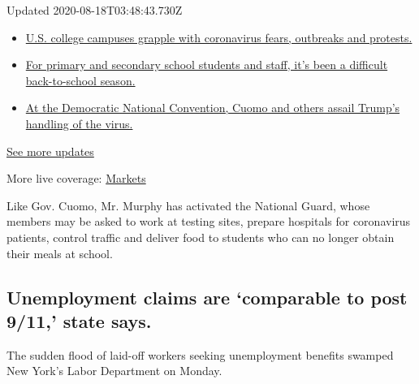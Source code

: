 Updated 2020-08-18T03:48:43.730Z

\begin{itemize}
\tightlist
\item
  \href{https://www.nytimes3xbfgragh.onion/2020/08/17/world/coronavirus-covid.html?action=click\&pgtype=Article\&state=default\&region=MAIN_CONTENT_1\&context=storylines_live_updates\#link-6fdbc8ef}{U.S.
  college campuses grapple with coronavirus fears, outbreaks and
  protests.}
\item
  \href{https://www.nytimes3xbfgragh.onion/2020/08/17/world/coronavirus-covid.html?action=click\&pgtype=Article\&state=default\&region=MAIN_CONTENT_1\&context=storylines_live_updates\#link-7e47207}{For
  primary and secondary school students and staff, it's been a difficult
  back-to-school season.}
\item
  \href{https://www.nytimes3xbfgragh.onion/2020/08/17/world/coronavirus-covid.html?action=click\&pgtype=Article\&state=default\&region=MAIN_CONTENT_1\&context=storylines_live_updates\#link-44c3fee2}{At
  the Democratic National Convention, Cuomo and others assail Trump's
  handling of the virus.}
\end{itemize}

\href{https://www.nytimes3xbfgragh.onion/2020/08/17/world/coronavirus-covid.html?action=click\&pgtype=Article\&state=default\&region=MAIN_CONTENT_1\&context=storylines_live_updates}{See
more updates}

More live coverage:
\href{https://www.nytimes3xbfgragh.onion/live/2020/08/17/business/stock-market-today-coronavirus?action=click\&pgtype=Article\&state=default\&region=MAIN_CONTENT_1\&context=storylines_live_updates}{Markets}

Like Gov. Cuomo, Mr. Murphy has activated the National Guard, whose
members may be asked to work at testing sites, prepare hospitals for
coronavirus patients, control traffic and deliver food to students who
can no longer obtain their meals at school.

\hypertarget{unemployment-claims-are-comparable-to-post-911-state-says}{%
\subsection{Unemployment claims are `comparable to post 9/11,' state
says.}\label{unemployment-claims-are-comparable-to-post-911-state-says}}

The sudden flood of laid-off workers seeking unemployment benefits
swamped New York's Labor Department on Monday.

